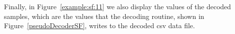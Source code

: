\vspace{-11.5pt}


\clearpage


Finally, in Figure~\ref{example:sf:11} we also display the values of the decoded samples, which are the values that the decoding routine, shown in Figure~\ref{pseudoDecoderSF}, writes to the decoded csv data file.


